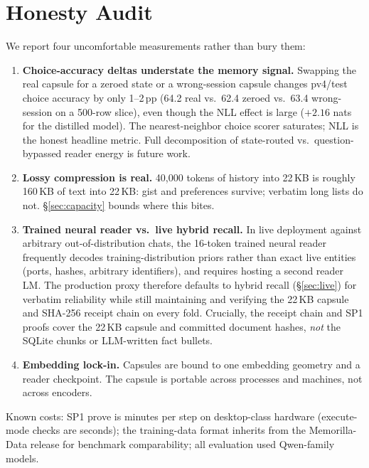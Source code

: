 \documentclass[11pt]{article}
\begin{document}
\section{Honesty Audit}
\label{sec:honesty}
We report four uncomfortable measurements rather than bury them:
\begin{enumerate}
\item \textbf{Choice-accuracy deltas understate the memory signal.}
Swapping the real capsule for a zeroed state or a wrong-session
capsule changes pv4/test choice accuracy by only 1--2\,pp (64.2 real
vs.\ 62.4 zeroed vs.\ 63.4 wrong-session on a 500-row slice), even
though the NLL effect is large ($+2.16$ nats for the distilled
model). The nearest-neighbor choice scorer saturates; NLL is the
honest headline metric. Full decomposition of state-routed vs.\
question-bypassed reader energy is future work.
\item \textbf{Lossy compression is real.} 40{,}000 tokens of history
into 22\,KB is roughly 160\,KB of text into 22\,KB: gist and
preferences survive; verbatim long lists do not. \S\ref{sec:capacity}
bounds where this bites.
\item \textbf{Trained neural reader vs.\ live hybrid recall.} In live
deployment against arbitrary out-of-distribution chats, the 16-token
trained neural reader frequently decodes training-distribution priors
rather than exact live entities (ports, hashes, arbitrary identifiers),
and requires hosting a second reader LM. The production proxy therefore
defaults to hybrid recall (\S\ref{sec:live}) for verbatim reliability
while still maintaining and verifying the 22\,KB capsule and SHA-256
receipt chain on every fold. Crucially, the receipt chain and SP1 proofs
cover the 22\,KB capsule and committed document hashes, \emph{not} the
SQLite chunks or LLM-written fact bullets.
\item \textbf{Embedding lock-in.} Capsules are bound to one embedding
geometry and a reader checkpoint. The capsule is portable across
processes and machines, not across encoders.
\end{enumerate}
Known costs: SP1 prove is minutes per step on desktop-class hardware
(execute-mode checks are seconds); the training-data format inherits
from the Memorilla-Data release for benchmark comparability; all
evaluation used Qwen-family models.
\end{document}
